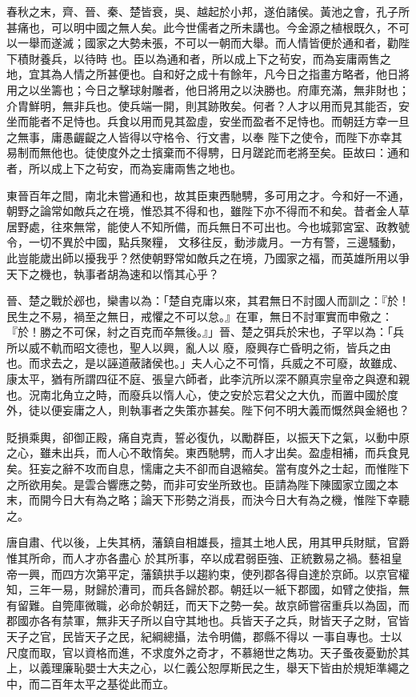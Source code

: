 \begin{pinyinscope}
 春秋之末，齊、晉、秦、楚皆衰，吳、越起於小邦，遂伯諸侯。黃池之會，孔子所甚痛也，可以明中國之無人矣。此今世儒者之所未講也。今金源之植根既久，不可以一舉而遂滅；國家之大勢未張，不可以一朝而大舉。而人情皆便於通和者，勸陛下積財養兵，以待時
 也。臣以為通和者，所以成上下之茍安，而為妄庸兩售之地，宜其為人情之所甚便也。自和好之成十有餘年，凡今日之指畫方略者，他日將用之以坐籌也；今日之擊球射雕者，他日將用之以決勝也。府庫充滿，無非財也；介胄鮮明，無非兵也。使兵端一開，則其跡敗矣。何者？人才以用而見其能否，安坐而能者不足恃也。兵食以用而見其盈虛，安坐而盈者不足恃也。而朝廷方幸一旦之無事，庸愚齷齪之人皆得以守格令、行文書，以奉
 陛下之使令，而陛下亦幸其易制而無他也。徒使度外之士擯棄而不得騁，日月蹉跎而老將至矣。臣故曰：通和者，所以成上下之茍安，而為妄庸兩售之地也。



 東晉百年之間，南北未嘗通和也，故其臣東西馳騁，多可用之才。今和好一不通，朝野之論常如敵兵之在境，惟恐其不得和也，雖陛下亦不得而不和矣。昔者金人草居野處，往來無常，能使人不知所備，而兵無日不可出也。今也城郭宮室、政教號令，一切不異於中國，點兵聚糧，
 文移往反，動涉歲月。一方有警，三邊騷動，此豈能歲出師以擾我乎？然使朝野常如敵兵之在境，乃國家之福，而英雄所用以爭天下之機也，執事者胡為速和以惰其心乎？



 晉、楚之戰於邲也，欒書以為：「楚自克庸以來，其君無日不討國人而訓之：『於！民生之不易，禍至之無日，戒懼之不可以怠。』在軍，無日不討軍實而申儆之：『於！勝之不可保，紂之百克而卒無後。』」晉、楚之弭兵於宋也，子罕以為：「兵所以威不軌而昭文德也，聖人以興，亂人以
 廢，廢興存亡昏明之術，皆兵之由也。而求去之，是以誣道蔽諸侯也。」夫人心之不可惰，兵威之不可廢，故雖成、康太平，猶有所謂四征不庭、張皇六師者，此李沆所以深不願真宗皇帝之與遼和親也。況南北角立之時，而廢兵以惰人心，使之安於忘君父之大仇，而置中國於度外，徒以便妄庸之人，則執事者之失策亦甚矣。陛下何不明大義而慨然與金絕也？



 貶損乘輿，卻御正殿，痛自克責，誓必復仇，以勵群臣，以振天下之氣，以動中原
 之心，雖未出兵，而人心不敢惰矣。東西馳騁，而人才出矣。盈虛相補，而兵食見矣。狂妄之辭不攻而自息，懦庸之夫不卻而自退縮矣。當有度外之士起，而惟陛下之所欲用矣。是雲合響應之勢，而非可安坐所致也。臣請為陛下陳國家立國之本末，而開今日大有為之略；論天下形勢之消長，而決今日大有為之機，惟陛下幸聽之。



 唐自肅、代以後，上失其柄，藩鎮自相雄長，擅其土地人民，用其甲兵財賦，官爵惟其所命，而人才亦各盡心
 於其所事，卒以成君弱臣強、正統數易之禍。藝祖皇帝一興，而四方次第平定，藩鎮拱手以趨約束，使列郡各得自達於京師。以京官權知，三年一易，財歸於漕司，而兵各歸於郡。朝廷以一紙下郡國，如臂之使指，無有留難。自筦庫微職，必命於朝廷，而天下之勢一矣。故京師嘗宿重兵以為固，而郡國亦各有禁軍，無非天子所以自守其地也。兵皆天子之兵，財皆天子之財，官皆天子之官，民皆天子之民，紀綱總攝，法令明備，郡縣不得以
 一事自專也。士以尺度而取，官以資格而進，不求度外之奇才，不慕絕世之雋功。天子蚤夜憂勤於其上，以義理廉恥嬰士大夫之心，以仁義公恕厚斯民之生，舉天下皆由於規矩準繩之中，而二百年太平之基從此而立。




\end{pinyinscope}

